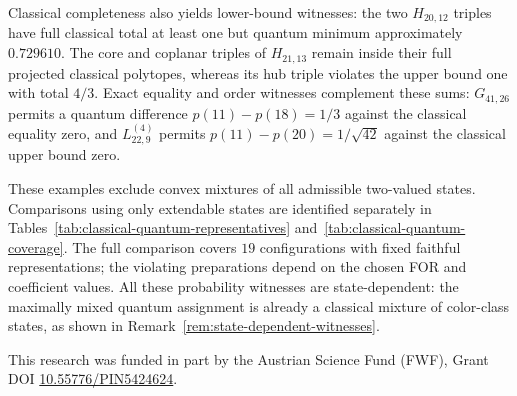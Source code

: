 \documentclass[aps,pra,reprint,superscriptaddress,longbibliography,nofootinbib,floatfix,10pt]{revtex4-2}
\theoremstyle{definition}\newtheorem{definition}[theorem]{Definition}
\theoremstyle{remark}\newtheorem{remark}[theorem]{Remark}
\begin{document}
Classical completeness also yields lower-bound witnesses: the two $H_{20,12}$ triples have full classical total at least one but quantum minimum approximately $0.729610$. The core and coplanar triples of $H_{21,13}$ remain inside their full projected classical polytopes, whereas its hub triple violates the upper bound one with total $4/3$. Exact equality and order witnesses complement these sums: $G_{41,26}$ permits a quantum difference $p(11)-p(18)=1/3$ against the classical equality zero, and $L_{22,9}^{(4)}$ permits $p(11)-p(20)=1/\sqrt{42}$ against the classical upper bound zero.

These examples exclude convex mixtures of all admissible two-valued states. Comparisons using only extendable states are identified separately in Tables~\ref{tab:classical-quantum-representatives} and~\ref{tab:classical-quantum-coverage}. The full comparison covers $19$ configurations with fixed faithful representations; the violating preparations depend on the chosen FOR and coefficient values. All these probability witnesses are state-dependent: the maximally mixed quantum assignment is already a classical mixture of color-class states, as shown in Remark~\ref{rem:state-dependent-witnesses}.

\begin{acknowledgments}
This research was funded in part by the Austrian Science Fund (FWF), Grant DOI \href{https://doi.org/10.55776/PIN5424624}{10.55776/PIN5424624}.
\end{acknowledgments}

\def\doibase{https://doi.org/}

\end{document}

